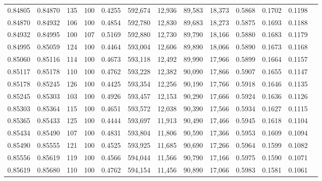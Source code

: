 \begin{tabular}{rrrrrrrrrrrrr}
0.84805 & 0.84870 &   135 & 100 &                                     0.4255 & 592,674 &  12,936 &  89,583 &  18,373 & 0.5868 & 0.1702 & 0.1198 \\
0.84870 & 0.84932 &   106 & 100 &                                     0.4854 & 592,780 &  12,830 &  89,683 &  18,273 & 0.5875 & 0.1693 & 0.1188 \\
0.84932 & 0.84995 &   100 & 107 &                                     0.5169 & 592,880 &  12,730 &  89,790 &  18,166 & 0.5880 & 0.1683 & 0.1179 \\
0.84995 & 0.85059 &   124 & 100 &                                     0.4464 & 593,004 &  12,606 &  89,890 &  18,066 & 0.5890 & 0.1673 & 0.1168 \\
0.85060 & 0.85116 &   114 & 100 &                                     0.4673 & 593,118 &  12,492 &  89,990 &  17,966 & 0.5899 & 0.1664 & 0.1157 \\
0.85117 & 0.85178 &   110 & 100 &                                     0.4762 & 593,228 &  12,382 &  90,090 &  17,866 & 0.5907 & 0.1655 & 0.1147 \\
0.85178 & 0.85245 &   126 & 100 &                                     0.4425 & 593,354 &  12,256 &  90,190 &  17,766 & 0.5918 & 0.1646 & 0.1135 \\
0.85245 & 0.85303 &   103 & 100 &                                     0.4926 & 593,457 &  12,153 &  90,290 &  17,666 & 0.5924 & 0.1636 & 0.1126 \\
0.85303 & 0.85364 &   115 & 100 &                                     0.4651 & 593,572 &  12,038 &  90,390 &  17,566 & 0.5934 & 0.1627 & 0.1115 \\
0.85365 & 0.85433 &   125 & 100 &                                     0.4444 & 593,697 &  11,913 &  90,490 &  17,466 & 0.5945 & 0.1618 & 0.1104 \\
0.85434 & 0.85490 &   107 & 100 &                                     0.4831 & 593,804 &  11,806 &  90,590 &  17,366 & 0.5953 & 0.1609 & 0.1094 \\
0.85490 & 0.85555 &   121 & 100 &                                     0.4525 & 593,925 &  11,685 &  90,690 &  17,266 & 0.5964 & 0.1599 & 0.1082 \\
0.85556 & 0.85619 &   119 & 100 &                                     0.4566 & 594,044 &  11,566 &  90,790 &  17,166 & 0.5975 & 0.1590 & 0.1071 \\
0.85619 & 0.85680 &   110 & 100 &                                     0.4762 & 594,154 &  11,456 &  90,890 &  17,066 & 0.5983 & 0.1581 & 0.1061 \\

\end{tabular}
